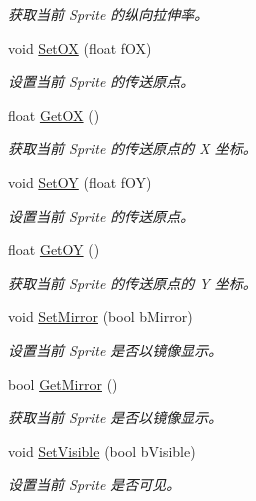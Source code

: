 \begin{DoxyCompactItemize}
\begin{DoxyCompactList}\small\item\em 获取当前 Sprite 的纵向拉伸率。 \end{DoxyCompactList}\item 
void \hyperlink{class_iris2_d_1_1_iris_sprite_ae4b2cbedd03a92ac0b68b9e701df2e68}{Set\+OX} (float f\+OX)
\begin{DoxyCompactList}\small\item\em 设置当前 Sprite 的传送原点。 \end{DoxyCompactList}\item 
float \hyperlink{class_iris2_d_1_1_iris_sprite_a134ad89bea2b664a912574737bd418e5}{Get\+OX} ()
\begin{DoxyCompactList}\small\item\em 获取当前 Sprite 的传送原点的 X 坐标。 \end{DoxyCompactList}\item 
void \hyperlink{class_iris2_d_1_1_iris_sprite_a6dba8492659c67a9c09359ed321a89b3}{Set\+OY} (float f\+OY)
\begin{DoxyCompactList}\small\item\em 设置当前 Sprite 的传送原点。 \end{DoxyCompactList}\item 
float \hyperlink{class_iris2_d_1_1_iris_sprite_adfdf12a18ff5237e1b27b63c2a27adaf}{Get\+OY} ()
\begin{DoxyCompactList}\small\item\em 获取当前 Sprite 的传送原点的 Y 坐标。 \end{DoxyCompactList}\item 
void \hyperlink{class_iris2_d_1_1_iris_sprite_a3ce55ee044b8345e93f8dfd45f23c72f}{Set\+Mirror} (bool b\+Mirror)
\begin{DoxyCompactList}\small\item\em 设置当前 Sprite 是否以镜像显示。 \end{DoxyCompactList}\item 
bool \hyperlink{class_iris2_d_1_1_iris_sprite_a5c4fa95fdadbb42ec65047b87786ec51}{Get\+Mirror} ()
\begin{DoxyCompactList}\small\item\em 获取当前 Sprite 是否以镜像显示。 \end{DoxyCompactList}\item 
void \hyperlink{class_iris2_d_1_1_iris_sprite_aae4592abf843276138b5805eb030575e}{Set\+Visible} (bool b\+Visible)
\begin{DoxyCompactList}\small\item\em 设置当前 Sprite 是否可见。 \end{DoxyCompactList}\item 

\end{DoxyCompactItemize}
